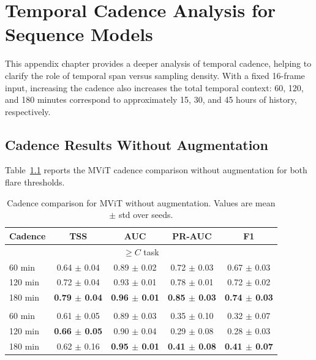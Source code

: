 \FloatBarrier

\chapter{Temporal Cadence Analysis for Sequence Models}
\label{app:no_aug_cadence}

This appendix chapter provides a deeper analysis of temporal cadence, helping to clarify the role of temporal span versus sampling density. With a fixed 16-frame input, increasing the cadence also increases the total temporal context: 60, 120, and 180 minutes correspond to approximately 15, 30, and 45 hours of history, respectively.

\section{Cadence Results Without Augmentation}
\label{app:no_aug_cadence_results}

Table~\ref{tab:appendix_cadence_c} reports the MViT cadence comparison without augmentation for both flare thresholds.

\begin{table}[!htbp]
\centering
\scriptsize
\caption{Cadence comparison for MViT without augmentation. Values are mean $\pm$ std over seeds.}
\label{tab:appendix_cadence_c}
\begin{tabular}{lcccc}
\toprule
Cadence & TSS & AUC & PR-AUC & F1 \\
\midrule
\multicolumn{5}{c}{$\geq C$ task} \\
\midrule
60 min & 0.64 $\pm$ 0.04 & 0.89 $\pm$ 0.02 & 0.72 $\pm$ 0.03 & 0.67 $\pm$ 0.03 \\
120 min & 0.72 $\pm$ 0.04 & 0.93 $\pm$ 0.01 & 0.78 $\pm$ 0.01 & 0.72 $\pm$ 0.02 \\
180 min & \textbf{0.79 $\pm$ 0.04} & \textbf{0.96 $\pm$ 0.01} & \textbf{0.85 $\pm$ 0.03} & \textbf{0.74 $\pm$ 0.03} \\
\addlinespace
\multicolumn{5}{c}{$\geq M$ task} \\
\midrule
60 min & 0.61 $\pm$ 0.05 & 0.89 $\pm$ 0.03 & 0.35 $\pm$ 0.10 & 0.32 $\pm$ 0.07 \\
120 min & \textbf{0.66 $\pm$ 0.05} & 0.90 $\pm$ 0.04 & 0.29 $\pm$ 0.08 & 0.28 $\pm$ 0.03 \\
180 min & 0.62 $\pm$ 0.16 & \textbf{0.95 $\pm$ 0.01} & \textbf{0.41 $\pm$ 0.08} & \textbf{0.41 $\pm$ 0.07} \\
\bottomrule
\end{tabular}
\end{table}

